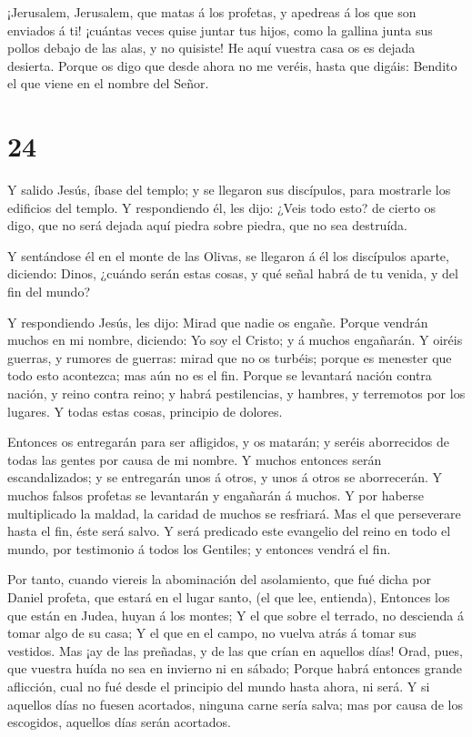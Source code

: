  ¡Jerusalem, Jerusalem, que matas á los profetas, y
apedreas á los que son enviados á ti! ¡cuántas veces quise juntar tus
hijos, como la gallina junta sus pollos debajo de las alas, y no
quisiste!  He aquí vuestra casa os es dejada desierta.
 Porque os digo que desde ahora no me veréis, hasta que
digáis: Bendito el que viene en el nombre del Señor.

\hypertarget{section-23}{%
\section{24}\label{section-23}}

 Y salido Jesús, íbase del templo; y se llegaron sus
discípulos, para mostrarle los edificios del templo.  Y
respondiendo él, les dijo: ¿Veis todo esto? de cierto os digo, que no
será dejada aquí piedra sobre piedra, que no sea destruída.

 Y sentándose él en el monte de las Olivas, se llegaron á él
los discípulos aparte, diciendo: Dinos, ¿cuándo serán estas cosas, y qué
señal habrá de tu venida, y del fin del mundo?

 Y respondiendo Jesús, les dijo: Mirad que nadie os engañe.
 Porque vendrán muchos en mi nombre, diciendo: Yo soy el
Cristo; y á muchos engañarán.  Y oiréis guerras, y rumores
de guerras: mirad que no os turbéis; porque es menester que todo esto
acontezca; mas aún no es el fin.  Porque se levantará nación
contra nación, y reino contra reino; y habrá pestilencias, y hambres, y
terremotos por los lugares.  Y todas estas cosas, principio
de dolores.

 Entonces os entregarán para ser afligidos, y os matarán; y
seréis aborrecidos de todas las gentes por causa de mi nombre.
 Y muchos entonces serán escandalizados; y se entregarán
unos á otros, y unos á otros se aborrecerán.  Y muchos
falsos profetas se levantarán y engañarán á muchos.  Y por
haberse multiplicado la maldad, la caridad de muchos se resfriará.
 Mas el que perseverare hasta el fin, éste será salvo.
 Y será predicado este evangelio del reino en todo el
mundo, por testimonio á todos los Gentiles; y entonces vendrá el fin.

 Por tanto, cuando viereis la abominación del asolamiento,
que fué dicha por Daniel profeta, que estará en el lugar santo, (el que
lee, entienda),  Entonces los que están en Judea, huyan á
los montes;  Y el que sobre el terrado, no descienda á
tomar algo de su casa;  Y el que en el campo, no vuelva
atrás á tomar sus vestidos.  Mas ¡ay de las preñadas, y de
las que crían en aquellos días!  Orad, pues, que vuestra
huída no sea en invierno ni en sábado;  Porque habrá
entonces grande aflicción, cual no fué desde el principio del mundo
hasta ahora, ni será.  Y si aquellos días no fuesen
acortados, ninguna carne sería salva; mas por causa de los escogidos,
aquellos días serán acortados.

